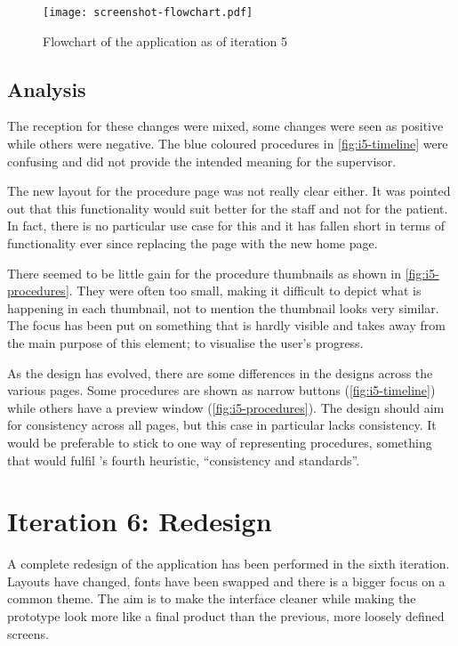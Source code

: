 \begin{figure}
    \centering
    \texttt{[image: screenshot-flowchart.pdf]}
    \caption{Flowchart of the application as of iteration 5}
    \label{fig:i5-flowchart}
\end{figure}

\subsection{Analysis}

The reception for these changes were mixed, some changes were seen as positive while others were negative. The blue coloured procedures in \autoref{fig:i5-timeline} were confusing and did not provide the intended meaning for the supervisor.

The new layout for the procedure page was not really clear either. It was pointed out that this functionality would suit better for the staff and not for the patient. In fact, there is no particular use case for this and it has fallen short in terms of functionality ever since replacing the page with the new home page.

There seemed to be little gain for the procedure thumbnails as shown in \autoref{fig:i5-procedures}. They were often too small, making it difficult to depict what is happening in each thumbnail, not to mention the thumbnail looks very similar. The focus has been put on something that is hardly visible and takes away from the main purpose of this element; to visualise the user's progress.

As the design has evolved, there are some differences in the designs across the various pages. Some procedures are shown as narrow buttons (\autoref{fig:i5-timeline}) while others have a preview window (\autoref{fig:i5-procedures}). The design should aim for consistency across all pages, but this case in particular lacks consistency. It would be preferable to stick to one way of representing procedures, something that would fulfil \textcite{nielsen1994}'s fourth heuristic, \enquote{consistency and standards}.

\section{Iteration 6: Redesign}
\label{sec:iteration6}

A complete redesign of the application has been performed in the sixth iteration. Layouts have changed, fonts have been swapped and there is a bigger focus on a common theme. The aim is to make the interface cleaner while making the prototype look more like a final product than the previous, more loosely defined screens.

